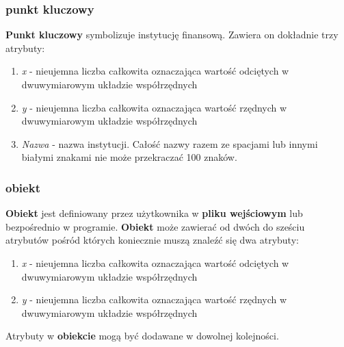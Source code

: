 \documentclass[hidelinks,10pt,a4paper]{article}
\begin{document}
\subsubsection{punkt kluczowy}
\textbf{Punkt kluczowy} symbolizuje instytucję finansową. 
Zawiera on dokładnie trzy atrybuty:
\begin{enumerate}
\item \textit{x} - nieujemna liczba całkowita oznaczająca wartość odciętych w dwuwymiarowym układzie współrzędnych
\item \textit{y} - nieujemna liczba całkowita oznaczająca wartość rzędnych w dwuwymiarowym układzie współrzędnych
\item \textit{Nazwa} - nazwa instytucji. Całość nazwy razem ze spacjami lub innymi białymi znakami nie może przekraczać 100 znaków. 
\end{enumerate}

\subsubsection{obiekt}
\textbf{Obiekt} jest definiowany przez użytkownika w \textbf{pliku wejściowym} lub bezpośrednio w programie. 
\textbf{Obiekt} może zawierać od dwóch do sześciu atrybutów pośród których koniecznie muszą znaleźć się dwa atrybuty:
\begin{enumerate}
\item \textit{x} - nieujemna liczba całkowita oznaczająca wartość odciętych w dwuwymiarowym układzie współrzędnych
\item \textit{y} - nieujemna liczba całkowita oznaczająca wartość rzędnych w dwuwymiarowym układzie współrzędnych
\end{enumerate}
Atrybuty w \textbf{obiekcie} mogą być dodawane w dowolnej kolejności.
\end{document}
